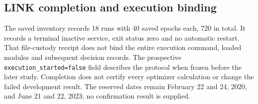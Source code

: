 \subsection{LINK completion and execution binding}
The saved inventory records 18 runs with 40 saved epochs each, 720 in total. It records a terminal inactive service, exit status zero and no automatic restart. That file-custody receipt does not bind the entire execution command, loaded modules and subsequent decision records. The prospective \texttt{execution\_started=false} field describes the protocol when frozen before the later study. Completion does not certify every optimizer calculation or change the failed development result. The reserved dates remain February 22 and 24, 2020, and June 21 and 22, 2023; no confirmation result is supplied.

